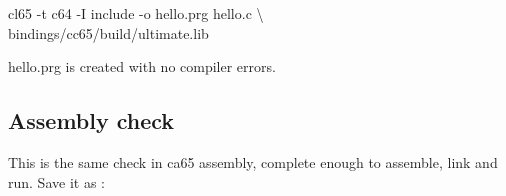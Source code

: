 \begin{listingbox}
cl65 -t c64 -I include -o hello.prg hello.c \textbackslash\\
\hspace*{2em}bindings/cc65/build/ultimate.lib
\end{listingbox}

\begin{resultbox}
hello.prg is created with no compiler errors.
\end{resultbox}


\subsection*{Assembly check}

This is the same check in ca65 assembly, complete enough to assemble, link and
run. Save it as :

